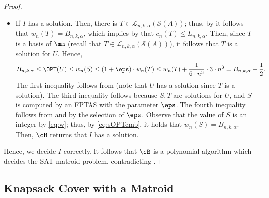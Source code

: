 \begin{proof}
\begin{itemize}
		\item If $I$ has a solution. Then, there is $T \in \mathcal{L}_{n,k,\alpha}(\mathcal{S}(A))$; thus, by   it follows that $w_n(T) = B_{n,k,\alpha}$, which implies by  that $c_n(T) \leq L_{n,k,\alpha}$. Then, since $T$ is a basis of $\mm$ (recall that $T \in \mathcal{L}_{n,k,\alpha}(\mathcal{S}(A))$), it follows that $T$ is a solution for $U$.  Hence,   
		\begin{equation}
			\label{eq:sOPTcmb}
			B_{n,k,\alpha} \leq \OPT(U) \leq w_n(S) \leq (1+\eps) \cdot w_n(T) \leq  w_n(T)+\frac{1}{6 \cdot n^3} \cdot 3 \cdot n^3 = B_{n,k,\alpha}+\frac{1}{2}.
		\end{equation} 	The first inequality follows from  (note that $U$ has a solution since $T$ is a solution). %
		The third inequality follows because $S,T$ are solutions for $U$, and $S$ is computed by an FPTAS with the parameter $\eps$. The fourth inequality follows from  and by the selection of $\eps$. Observe that the value of $S$ is an integer by \eqref{eq:w}; thus, by \eqref{eq:sOPTcmb}, %
		it holds that $w_n(S) = B_{n,k,\alpha}$. Then, $\cB$ returns that $I$ has a solution.  
	\end{itemize}
	Hence, %
	we decide $I$ correctly. %
	It follows that $\cB$ is %
	a polynomial algorithm which decides the SAT-matroid problem, contradicting . 
\end{proof}























	\subsection{Knapsack Cover with a Matroid}

